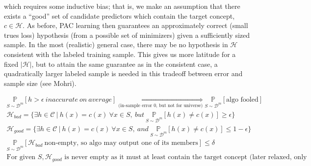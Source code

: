 which requires some inductive bias; that is, we make an assumption that there
exists a ``good'' set of candidate predictors which contain the target concept,
$c \in \mathcal{H}$. As before, PAC learning then guarantees
an approximately correct (small trues loss) hypothesis (from a possible set of
minimizers) given a sufficiently sized sample.
In the most (realistic) general case, there may be no hypothesis in
$\mathcal{H}$ consistent with the labeled training sample. This
gives us more latitude for a fixed $|\mathcal{H}|$, but to attain the same
guarantee as in the consistent case, a quadratically larger labeled sample is
needed in this tradeoff between error and sample size (see Mohri).\par

\begin{gather*}
	\underset{S \sim \mathcal{D}^m}{\mathbb{P}}[h >
		\epsilon~inaccurate~on~average] \underset{\text{(in-sample
			error 0, but not for
			universe)}}{\iff} \underset{S \sim
		\mathcal{D}^m}{\mathbb{P}}[\text{algo
			fooled}]\\
	\mathcal{H}_{bad} = \{\exists h \in \mathcal{C} ~|~ h(x) = c(x)
	~\forall x \in S,~but~\underset{S \sim \mathcal{D}^m}{\mathbb{P}}[h(x)
		\neq
		c(x) ] \geq \epsilon\}\\
	\mathcal{H}_{good} = \{\exists h \in \mathcal{C} ~|~ h(x) = c(x)
	~\forall x \in S,~and~\underset{S \sim \mathcal{D}^m}{\mathbb{P}}[h(x)
		\neq
		c(x) ] \leq 1-\epsilon\}\\
	\underset{S \sim \mathcal{D}^m}{\mathbb{P}}[\mathcal{H}_{bad}
		~\text{non-empty, so algo may output one of its members}] \leq
	\delta\\
	\text{For given $S, \mathcal{H}_{good}$ is never empty as it must at
		least contain the target concept (later relaxed, only for
		``realizable''
		version)}\\
\end{gather*}

